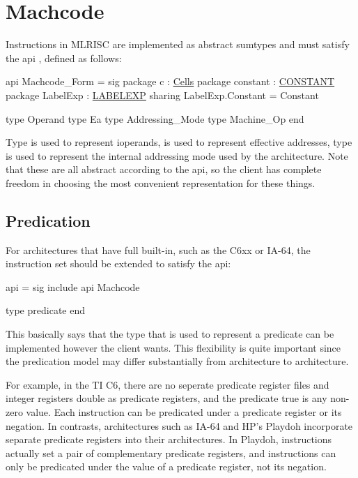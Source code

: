 \section{Machcode}

  Instructions in MLRISC are implemented as abstract sumtypes and
must satisfy the api 
, defined as follows:

\begin{SML}
api Machcode_Form =
sig
   package c        : \href{cells.html}{Cells}
   package constant : \href{constants.html}{CONSTANT}
   package LabelExp : \href{labelexp.html}{LABELEXP}
      sharing LabelExp.Constant = Constant

   type Operand
   type Ea
   type Addressing_Mode
   type Machine_Op
end
\end{SML}

Type  is used to represent ioperands,
 is used to represent effective addresses, type 
 is used to represent the internal addressing mode
used by the architecture.  Note that these are all abstract according to 
the api, so the client has complete freedom in choosing the most
convenient representation for these things.

\subsection{Predication}
   For architectures that have full 
built-in, such as the C6xx or IA-64, the instruction set should be
extended to satisfy the api: 
\begin{SML}
api  =
sig
   include api Machcode
   
   type predicate  
end
\end{SML}
This basically says that the type that is used to represent a predicate
can be implemented however the client wants.  This flexibility
is quite important since the predication model may differ substantially
from architecture to architecture.

For example, in the TI C6, there are no seperate predicate register files
and integer registers double as predicate registers, and the predicate
true is any non-zero value.  Each instruction can be predicated under a
predicate register or its negation.  In contrasts, architectures such as
IA-64 and HP's Playdoh incorporate separate predicate registers into their 
architectures.  In Playdoh,  instructions 
actually set a pair of complementary predicate registers, 
and instructions can only
be predicated under the value of a predicate register, not its negation.

